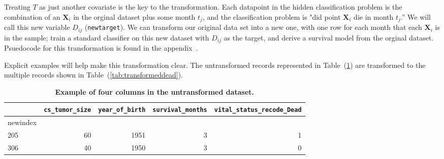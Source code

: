\documentclass[10pt,letterpaper]{article}
\newcommand{\codewhite}[1]{\colorbox{white}{\texttt{#1}}}
\begin{document}
Treating $T$ as just another covariate is the key to the transformation. Each datapoint in the hidden classification problem is the combination of an $\mathbf{X}_{i}$ in the orginal dataset plus some month $t_{j}$, and the classification problem is "did point $\mathbf{X}_{i}$ die in month $t_{j}$.'' We will call this new variable $D_{ij}$ (\codewhite{newtarget}).
We can transform our original data set into a new one, with one row for each month that each $\mathbf{X}_{i}$ is in the sample; train a standard classifier on this new dataset with $D_{ij}$ as the target, and derive a survival model from the orginal dataset.
Psuedocode for this transformation is found in the appendix~.

Explicit examples will help make this transformation clear.
The untransformed records represented in Table~(\ref{tab:originaldead}) are transformed to the multiple records shown in Table~(\ref{tab:transformeddead}).




\begin{table}[H]
\begin{adjustwidth}{-2.25in}{0in} %
\caption{\label{tab:originaldead} {\bf Example of four columns in the untransformed dataset.}}
\begin{tabular}{lrrrr}
\toprule
{} &  \codewhite{cs\_tumor\_size} &  \codewhite{year\_of\_birth} &  \codewhite{survival\_months} &  \codewhite{vital\_status\_recode\_Dead} \\
\midrule
newindex &                &                &        &            \\
205      &             60 &           1951 &      3 &          1 \\
306      &            40  &         1950  &      3    &     0    \\
\bottomrule
\end{tabular}
\end{adjustwidth}
\end{table}
\end{document}
